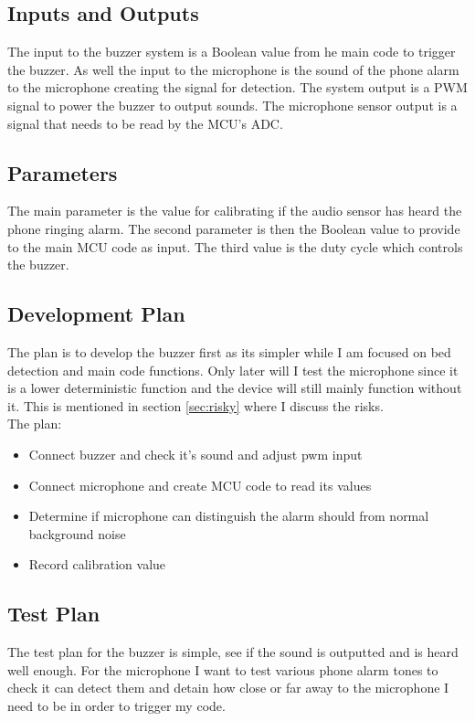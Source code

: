 \documentclass[11pt]{article}
\begin{document}
\subsection*{Inputs and Outputs}
The input to the buzzer system is a Boolean value from he main code to trigger the buzzer.
As well the input to the microphone is the sound of the phone alarm to the microphone creating the signal for detection.
The system output is a PWM signal to power the buzzer to output sounds.
The microphone sensor output is a signal that needs to be read by the MCU's ADC.
 
\subsection*{Parameters}
The main parameter is the value for calibrating if the audio sensor has heard the phone ringing alarm.
The second parameter is then the Boolean value to provide to the main MCU code as input.
The third value is the duty cycle which controls the buzzer.  

\subsection*{Development Plan}
The plan is to develop the buzzer first as its simpler while I am focused on bed detection and main code functions. 
Only later will I test the microphone since it is a lower deterministic function and the device will still mainly function without it.
This is mentioned in section \ref{sec:risky} where I discuss the risks.\\

The plan:
\begin{itemize}
	\item Connect buzzer and check it's sound and adjust pwm input
	\item Connect microphone and create MCU code to read its values
	\item Determine if microphone can distinguish the alarm should from normal background noise 
	\item Record calibration value
\end{itemize}

\subsection*{Test Plan}
The test plan for the buzzer is simple, see if the sound is outputted and is heard well enough. 
For the microphone I want to test various phone alarm tones to check it can detect them and detain how close or far away to the microphone I need to be in order to trigger my code. 
\end{document}
